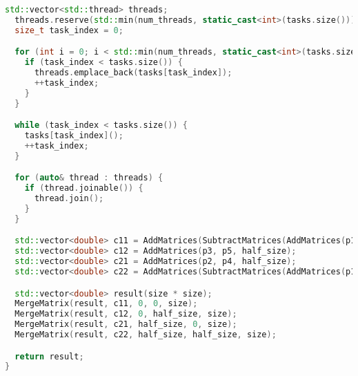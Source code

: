 \documentclass[14pt,a4paper]{extarticle}
\begin{document}
\begin{lstlisting}[language=C++]
  std::vector<std::thread> threads;
  threads.reserve(std::min(num_threads, static_cast<int>(tasks.size())));
  size_t task_index = 0;

  for (int i = 0; i < std::min(num_threads, static_cast<int>(tasks.size())); ++i) {
    if (task_index < tasks.size()) {
      threads.emplace_back(tasks[task_index]);
      ++task_index;
    }
  }

  while (task_index < tasks.size()) {
    tasks[task_index]();
    ++task_index;
  }

  for (auto& thread : threads) {
    if (thread.joinable()) {
      thread.join();
    }
  }

  std::vector<double> c11 = AddMatrices(SubtractMatrices(AddMatrices(p1, p4, half_size), p5, half_size), p7, half_size);
  std::vector<double> c12 = AddMatrices(p3, p5, half_size);
  std::vector<double> c21 = AddMatrices(p2, p4, half_size);
  std::vector<double> c22 = AddMatrices(SubtractMatrices(AddMatrices(p1, p3, half_size), p2, half_size), p6, half_size);

  std::vector<double> result(size * size);
  MergeMatrix(result, c11, 0, 0, size);
  MergeMatrix(result, c12, 0, half_size, size);
  MergeMatrix(result, c21, half_size, 0, size);
  MergeMatrix(result, c22, half_size, half_size, size);

  return result;
}
\end{lstlisting}
\end{document}
